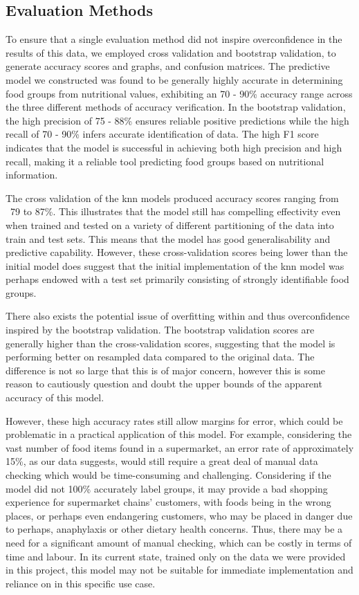 \documentclass[11pt]{article}
\begin{document}
\subsection{Evaluation Methods}
To ensure that a single evaluation method did not inspire overconfidence in the results of this data, we employed cross validation and bootstrap validation, to generate accuracy scores and graphs, and confusion matrices. The predictive model we constructed was found to be generally highly accurate in determining food groups from nutritional values, exhibiting an 70 - 90\% accuracy range across the three different methods of accuracy verification.
In the bootstrap validation, the high precision of 75 - 88\% ensures reliable positive predictions while the high recall of 70 - 90\% infers accurate identification of data. The high F1 score indicates that the model is successful in achieving both high precision and high recall, making it a reliable tool predicting food groups based on nutritional information.



The cross validation of the knn models produced accuracy scores ranging from ~79 to 87\%. This illustrates that the model still has compelling effectivity even when trained and tested on a variety of different partitioning of the data into train and test sets. This means that the model has good generalisability and predictive capability. However, these cross-validation scores being lower than the initial model does suggest that the initial implementation of the knn model was perhaps endowed with a test set primarily consisting of strongly identifiable food groups.

There also exists the potential issue of overfitting within and thus overconfidence inspired by the bootstrap validation. The bootstrap validation scores are generally higher than the cross-validation scores, suggesting that the model is performing better on resampled data compared to the original data. The difference is not so large that this is of major concern, however this is some reason to cautiously question and doubt the upper bounds of the apparent accuracy of this model. 

However, these high accuracy rates still allow margins for error, which could be problematic in a practical application of this model. For example, considering the vast number of food items found in a supermarket, an error rate of approximately 15\%, as our data suggests, would still require a great deal of manual data checking which would be time-consuming and challenging. Considering if the model did not 100\% accurately label groups, it may provide a bad shopping experience for supermarket chains’ customers, with foods being in the wrong places, or perhaps even endangering customers, who may be placed in danger due to perhaps, anaphylaxis or other dietary health concerns. Thus, there may be a need for a significant amount of manual checking, which can be costly in terms of time and labour. In its current state, trained only on the data we were provided in this project, this model may not be suitable for immediate implementation and reliance on in this specific use case. 
\end{document}
